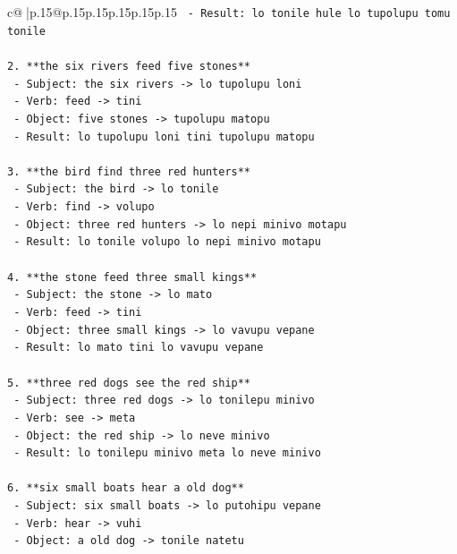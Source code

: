 \documentclass{article}
\begin{document}
{\begin{supertabular}{c@{$\;$}|p{.15\linewidth}@{}p{.15\linewidth}p{.15\linewidth}p{.15\linewidth}p{.15\linewidth}p{.15\linewidth}}
{{{\texttt{   {-} Result: lo tonile hule lo tupolupu tomu tonile} \\
\\ 
\texttt{2. **the six rivers feed five stones**} \\
\texttt{   {-} Subject: the six rivers {-}> lo tupolupu loni} \\
\texttt{   {-} Verb: feed {-}> tini} \\
\texttt{   {-} Object: five stones {-}> tupolupu matopu} \\
\texttt{   {-} Result: lo tupolupu loni tini tupolupu matopu} \\
\\ 
\texttt{3. **the bird find three red hunters**} \\
\texttt{   {-} Subject: the bird {-}> lo tonile} \\
\texttt{   {-} Verb: find {-}> volupo} \\
\texttt{   {-} Object: three red hunters {-}> lo nepi minivo motapu} \\
\texttt{   {-} Result: lo tonile volupo lo nepi minivo motapu} \\
\\ 
\texttt{4. **the stone feed three small kings**} \\
\texttt{   {-} Subject: the stone {-}> lo mato} \\
\texttt{   {-} Verb: feed {-}> tini} \\
\texttt{   {-} Object: three small kings {-}> lo vavupu vepane} \\
\texttt{   {-} Result: lo mato tini lo vavupu vepane} \\
\\ 
\texttt{5. **three red dogs see the red ship**} \\
\texttt{   {-} Subject: three red dogs {-}> lo tonilepu minivo} \\
\texttt{   {-} Verb: see {-}> meta} \\
\texttt{   {-} Object: the red ship {-}> lo neve minivo} \\
\texttt{   {-} Result: lo tonilepu minivo meta lo neve minivo} \\
\\ 
\texttt{6. **six small boats hear a old dog**} \\
\texttt{   {-} Subject: six small boats {-}> lo putohipu vepane} \\
\texttt{   {-} Verb: hear {-}> vuhi} \\
\texttt{   {-} Object: a old dog {-}> tonile natetu} \\
}}}
\end{supertabular}}
\end{document}
